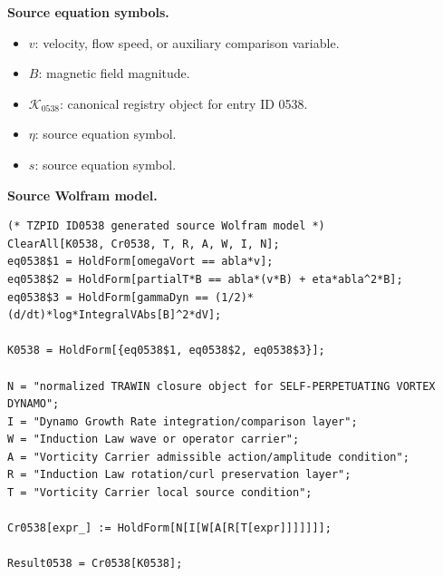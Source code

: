 \begin{minipage}[t]{0.49\linewidth}
\begingroup
\small
\raggedright
\textbf{Source equation symbols.}\par
\begin{itemize}[leftmargin=1.35em,itemsep=1pt,topsep=1pt,parsep=0pt]
    \item $v$: velocity, flow speed, or auxiliary comparison variable.
    \item $B$: magnetic field magnitude.
    \item $\mathcal{K}_{0538}$: canonical registry object for entry ID 0538.
    \item $\eta$: source equation symbol.
    \item $s$: source equation symbol.
\end{itemize}
\endgroup
\end{minipage}\hfill
\begin{minipage}[t]{0.47\linewidth}
\begingroup
\scriptsize
\raggedright
\textbf{Source Wolfram model.}\par
\begin{Verbatim}[fontsize=\tiny,breaklines=true,breakanywhere=true]
(* TZPID ID0538 generated source Wolfram model *)
ClearAll[K0538, Cr0538, T, R, A, W, I, N];
eq0538$1 = HoldForm[omegaVort == abla*v];
eq0538$2 = HoldForm[partialT*B == abla*(v*B) + eta*abla^2*B];
eq0538$3 = HoldForm[gammaDyn == (1/2)*(d/dt)*log*IntegralVAbs[B]^2*dV];

K0538 = HoldForm[{eq0538$1, eq0538$2, eq0538$3}];

N = "normalized TRAWIN closure object for SELF-PERPETUATING VORTEX DYNAMO";
I = "Dynamo Growth Rate integration/comparison layer";
W = "Induction Law wave or operator carrier";
A = "Vorticity Carrier admissible action/amplitude condition";
R = "Induction Law rotation/curl preservation layer";
T = "Vorticity Carrier local source condition";

Cr0538[expr_] := HoldForm[N[I[W[A[R[T[expr]]]]]]];

Result0538 = Cr0538[K0538];
\end{Verbatim}
\endgroup
\end{minipage}

